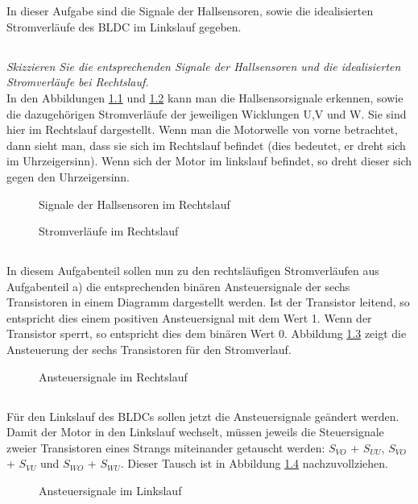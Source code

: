 
\chapter{}\label{ch:auf2}
In dieser Aufgabe sind die Signale der Hallsensoren, sowie die idealisierten Stromverläufe des BLDC im Linkslauf gegeben.

\section{}\label{sec:2a}
\textit{Skizzieren Sie die entsprechenden Signale der Hallsensoren und die idealisierten Stromverläufe bei Rechtslauf.}\\
In den Abbildungen \ref{fig:2a:hall} und \ref{fig:2a:strom} kann man die Hallsensorsignale erkennen, sowie die dazugehörigen Stromverläufe der jeweiligen Wicklungen U,V und W. Sie sind hier im Rechtslauf dargestellt. Wenn man die Motorwelle von vorne betrachtet, dann sieht man, dass sie sich im Rechtslauf befindet (dies bedeutet, er dreht sich im Uhrzeigersinn). Wenn sich der Motor im linkslauf befindet, so dreht dieser sich gegen den Uhrzeigersinn.
\begin{figure}[h]
	\centering
	
	\caption{Signale der Hallsensoren im Rechtslauf}
	\label{fig:2a:hall}
\end{figure}
\begin{figure}[h]
	\centering
	
	\caption{Stromverläufe im Rechtslauf}
	\label{fig:2a:strom}
\end{figure}

\section{}\label{sec:2b}
In diesem Aufgabenteil sollen nun zu den rechtsläufigen Stromverläufen aus Aufgabenteil a) die entsprechenden binären Ansteuersignale der sechs Transistoren in einem Diagramm dargestellt werden. Ist der Transistor leitend, so entspricht dies einem positiven Ansteuersignal mit dem Wert 1. Wenn der Transistor sperrt, so entspricht dies dem binären Wert 0. Abbildung \ref{fig:2b:rechts} zeigt die Ansteuerung der sechs Transistoren für den Stromverlauf.
\begin{figure}[h]
	\centering
	
	\caption{Ansteuersignale im Rechtslauf}
	\label{fig:2b:rechts}
\end{figure}

\section{}\label{sec:2c}
Für den Linkslauf des BLDCs sollen jetzt die Ansteuersignale geändert werden.
Damit der Motor in den Linkslauf wechselt, müssen jeweils die Steuersignale zweier Transistoren eines Strangs miteinander getauscht werden: $ S_{VO} $ + $ S_{UU} $, $ S_{VO} $ + $ S_{VU} $ und $ S_{WO} $ + $ S_{WU} $. Dieser Tausch ist in Abbildung \ref{fig:2b:links} nachzuvollziehen.
\begin{figure}[h]
	\centering
	
	\caption{Ansteuersignale im Linkslauf}
	\label{fig:2b:links}
\end{figure}

